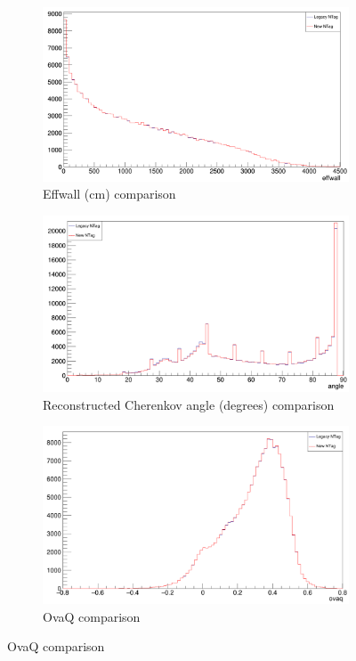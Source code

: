 \begin{figure}[t!]
    \medskip
    \begin{subfigure}{0.48\textwidth}
    \includegraphics[width=\linewidth]{Figures/effwall_recon_compare.PNG}
    \caption{Effwall (cm) comparison} \label{fig:effwall_recon_compare}
    \end{subfigure}\hspace*{\fill}
    \begin{subfigure}{0.48\textwidth}
    \includegraphics[width=\linewidth]{Figures/angle_recon_compare.PNG}
    \caption{Reconstructed Cherenkov angle (degrees) comparison} \label{fig:angle_recon_compare}
    \end{subfigure}
    
    \medskip
    \begin{subfigure}{0.48\textwidth}
    \includegraphics[width=\linewidth]{Figures/ovaq_recon_compare.PNG}
    \caption{OvaQ comparison} \label{fig:ovaq_recon_compare}
    \end{subfigure}\hspace*{\fill}
    

\end{figure}
